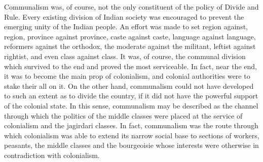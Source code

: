 \begin{multicols}{2}
Communalism was, of course, not the only constituent of the policy of Divide and Rule. Every existing division of Indian society was encouraged to prevent the emerging unity of the Indian people. An effort was made to set region against, region, province against province, caste against caste, language against language, reformers against the orthodox, the moderate against the militant, leftist against rightist, and even class against class. It was, of course, the communal division which survived to the end and proved the most serviceable. In fact, near the end, it was to become the main prop of colonialism, and colonial authorities were to stake their all on it. On the other hand, communalism could not have developed to such an extent as to divide the country, if it did not have the powerful support of the colonial state. In this sense, communalism may be described as the channel through which the politics of the middle classes were placed at the service of colonialism and the jagirdari classes. In fact, communalism was the route through which colonialism was able to extend its narrow social base to sections of workers, peasants, the middle classes and the bourgeoisie whose interests were otherwise in contradiction with colonialism. 


\end{multicols}
